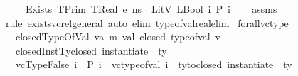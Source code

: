 \begin{isabellebody}
\ \ \ {\isachardoublequoteopen}{\isasymLambda}{\isacharcomma}{\kern0pt}{\isasymGamma}{\isacharcomma}{\kern0pt}{\isasymOmega}\ {\isasymturnstile}\ {\isasymlangle}Exists\ {\isacharparenleft}{\kern0pt}TPrim\ TReal{\isacharparenright}{\kern0pt}\ e{\isacharcomma}{\kern0pt}\ ns{\isasymrangle}\ {\isasymDown}\ LitV\ {\isacharparenleft}{\kern0pt}LBool\ {\isacharparenleft}{\kern0pt}{\isasymexists}i{\isachardot}{\kern0pt}\ P\ i{\isacharparenright}{\kern0pt}{\isacharparenright}{\kern0pt}{\isachardoublequoteclose}\isanewline
%
\isadelimproof
\ \ %
\endisadelimproof
%
\isatagproof
{}\isamarkupfalse%
\ assms\isanewline
\ \ \isamarkupfalse%
\ {\isacharparenleft}{\kern0pt}rule\ exists{\isacharunderscore}{\kern0pt}vc{\isacharunderscore}{\kern0pt}rel{\isacharunderscore}{\kern0pt}general{\isacharcomma}{\kern0pt}\ auto\ elim{\isacharcolon}{\kern0pt}\ type{\isacharunderscore}{\kern0pt}of{\isacharunderscore}{\kern0pt}val{\isacharunderscore}{\kern0pt}real{\isacharunderscore}{\kern0pt}elim{\isacharparenright}{\kern0pt}%
\endisatagproof
{\isafoldproof}%
%
\isadelimproof
\isanewline
%
\endisadelimproof
\isanewline
\isanewline
{}\isamarkupfalse%
\ forall{\isacharunderscore}{\kern0pt}vc{\isacharunderscore}{\kern0pt}type{\isacharcolon}{\kern0pt}\isanewline
\ \ \ closedTypeOfVal{\isacharcolon}{\kern0pt}{\isachardoublequoteopen}{\isasymAnd}\ v{\isacharcolon}{\kern0pt}{\isacharcolon}{\kern0pt}{\isacharparenleft}{\kern0pt}{\isacharprime}{\kern0pt}a{\isacharcomma}{\kern0pt}\ {\isacharprime}{\kern0pt}m{\isacharparenright}{\kern0pt}\ val{\isachardot}{\kern0pt}\ closed\ {\isacharparenleft}{\kern0pt}type{\isacharunderscore}{\kern0pt}of{\isacharunderscore}{\kern0pt}val\ v{\isacharparenright}{\kern0pt}{\isachardoublequoteclose}\ \isanewline
\ \ \ closedInstTy{\isacharcolon}{\kern0pt}{\isachardoublequoteopen}closed\ {\isacharparenleft}{\kern0pt}instantiate\ {\isasymOmega}\ ty{\isacharparenright}{\kern0pt}{\isachardoublequoteclose}\ \isanewline
\ \ \ vcTypeFalse{\isacharcolon}{\kern0pt}{\isachardoublequoteopen}{\isasymAnd}\ i{\isachardot}{\kern0pt}\ {\isasymnot}\ {\isacharparenleft}{\kern0pt}P\ i{\isacharparenright}{\kern0pt}\ {\isasymLongrightarrow}\ vc{\isacharunderscore}{\kern0pt}type{\isacharunderscore}{\kern0pt}of{\isacharunderscore}{\kern0pt}val\ i\ {\isacharequal}{\kern0pt}\ ty{\isacharunderscore}{\kern0pt}to{\isacharunderscore}{\kern0pt}closed\ {\isacharparenleft}{\kern0pt}instantiate\ {\isasymOmega}\ ty{\isacharparenright}{\kern0pt}{\isachardoublequoteclose}\ \isanewline

\end{isabellebody}
